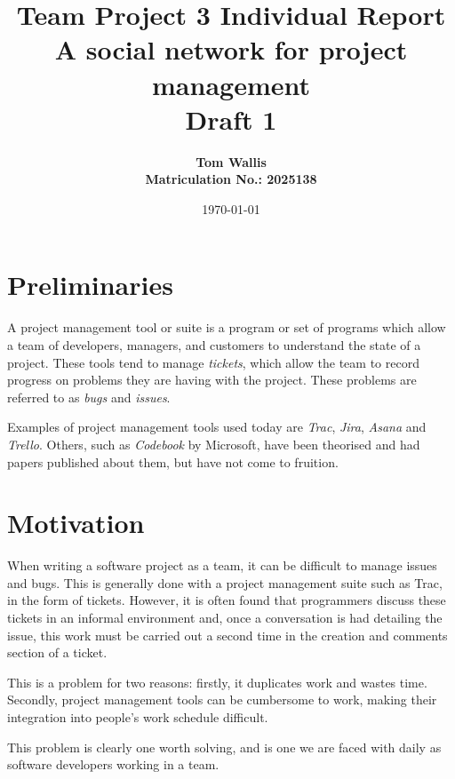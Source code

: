 \documentclass[draft, 10pt]{article}
\author{\bf Tom Wallis \\ \bf Matriculation No.: 2025138}
\date{\today}
\title{Team Project 3 Individual Report\\
A social network for project management\\ \vspace{4mm}
Draft 1}
\begin{document}
\maketitle


\section{Preliminaries}\par
A project management tool or suite is a program or set of programs which allow a team of developers, managers, and customers to understand the state of a project. These tools tend to manage \emph{tickets}, which allow the team to record progress on problems they are having with the project. These problems are referred to as \emph{bugs} and \emph{issues}. \par
Examples of project management tools used today are \emph{Trac}, \emph{Jira}, \emph{Asana} and \emph{Trello}. Others, such as \emph{Codebook} by Microsoft, have been theorised and had papers published about them, but have not come to fruition. 


\section{Motivation} 
When writing a software project as a team, it can be difficult to manage issues and bugs. This is generally done with a project management suite such as Trac, in the form of tickets. However, it is often found that programmers discuss these tickets in an informal environment and, once a conversation is had detailing the issue, this work must be carried out a second time in the creation and comments section of a ticket. \par
This is a problem for two reasons: firstly, it duplicates work and wastes time. Secondly, project management tools can be cumbersome to work, making their integration into people's work schedule difficult.\par
This problem is clearly one worth solving, and is one we are faced with daily as software developers working in a team. 
\end{document}
